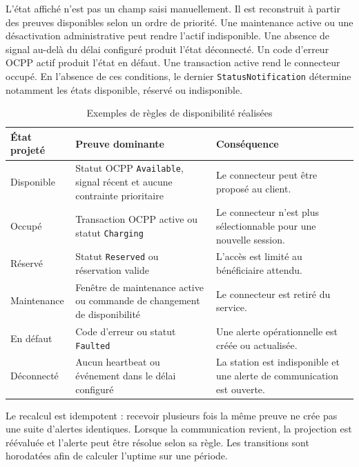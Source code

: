 L'état affiché n'est pas un champ saisi manuellement. Il est reconstruit à partir
des preuves disponibles selon un ordre de priorité. Une maintenance active ou
une désactivation administrative peut rendre l'actif indisponible. Une absence
de signal au-delà du délai configuré produit l'état déconnecté. Un code d'erreur
OCPP actif produit l'état en défaut. Une transaction active rend le connecteur
occupé. En l'absence de ces conditions, le dernier
\texttt{StatusNotification} détermine notamment les états disponible, réservé ou
indisponible.

\begin{table}[H]
  \centering
  \caption{Exemples de règles de disponibilité réalisées}
  \label{tab:implementation-availability-rules}
  \begin{tabularx}{\textwidth}{|p{3.3cm}|p{5.1cm}|Y|}
    \hline
    \textbf{État projeté} & \textbf{Preuve dominante} &
    \textbf{Conséquence}\\\hline

    Disponible & Statut OCPP \texttt{Available}, signal récent et aucune
    contrainte prioritaire & Le connecteur peut être proposé au client.\\\hline
    Occupé & Transaction OCPP active ou statut \texttt{Charging} &
    Le connecteur n'est plus sélectionnable pour une nouvelle session.\\\hline
    Réservé & Statut \texttt{Reserved} ou réservation valide &
    L'accès est limité au bénéficiaire attendu.\\\hline
    Maintenance & Fenêtre de maintenance active ou commande de changement de
    disponibilité & Le connecteur est retiré du service.\\\hline
    En défaut & Code d'erreur ou statut \texttt{Faulted} &
    Une alerte opérationnelle est créée ou actualisée.\\\hline
    Déconnecté & Aucun heartbeat ou événement dans le délai configuré &
    La station est indisponible et une alerte de communication est ouverte.\\\hline

  \end{tabularx}
\end{table}

Le recalcul est idempotent : recevoir plusieurs fois la même preuve ne crée pas
une suite d'alertes identiques. Lorsque la communication revient, la projection
est réévaluée et l'alerte peut être résolue selon sa règle. Les transitions sont
horodatées afin de calculer l'uptime sur une période.

